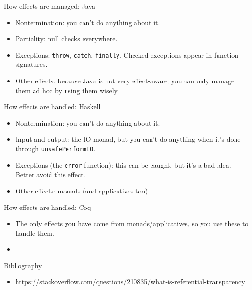 \documentclass{beamer}
\newcommand{\link}[2]{\href{#2}{\color{blue}{#1}}}
\begin{document}
\begin{frame}{How effects are managed: Java}
\begin{itemize}
	\item Nontermination: you can't do anything about it.
	\item Partiality: null checks everywhere.
	\item Exceptions: \texttt{throw}, \texttt{catch}, \texttt{finally}. Checked exceptions appear in function signatures.
	\item Other effects: because Java is not very effect-aware, you can only manage them ad hoc by using them wisely.
\end{itemize}
\end{frame}

\begin{frame}{How effects are handled: Haskell}
\begin{itemize}
	\item Nontermination: you can't do anything about it.
	\item Input and output: the IO monad, but you can't do anything when it's done through \texttt{unsafePerformIO}.
	\item Exceptions (the \texttt{error} function): this can be caught, but it's a bad idea. Better avoid this effect.
	\item Other effects: monads (and applicatives too).
\end{itemize}
\end{frame}

\begin{frame}{How effects are handled: Coq}
\begin{itemize}
	\item The only effects you have come from monads/applicatives, so you use these to handle them.
\end{itemize}
\end{frame}


\begin{frame}{}
\begin{itemize}
	\item
\end{itemize}
\end{frame}

\begin{frame}{Bibliography}
\begin{itemize}
	\item \link{Referential transparency}{https://stackoverflow.com/questions/210835/what-is-referential-transparency}{https://stackoverflow.com/questions/210835/what-is-referential-transparency}
\end{itemize}
\end{frame}
\end{document}
